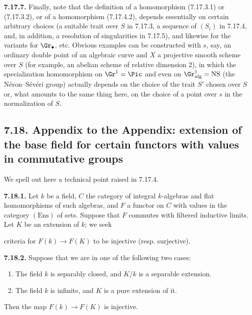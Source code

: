 \textbf{7.17.7.} Finally, note that the definition of a homomorphism (7.17.3.1) or (7.17.3.2), or of a homomorphism (7.17.4.2), depends essentially on certain arbitrary choices (a suitable trait over \(S\) in 7.17.3, a sequence of \((S_i)\) in 7.17.4, and, in addition, a resolution of singularities in 7.17.5), and likewise for the variants for \(\Gr_\bullet\), etc. Obvious examples can be constructed with \(s\), say, an ordinary double point of an algebraic curve and \(X\) a projective smooth scheme over \(S\) (for example, an abelian scheme of relative dimension 2), in which the specialization homomorphism on \(\Gr^1=\Pic\) and even on \(\Gr^1_{\mathrm{alg}}=\mathrm{NS}\) (the Néron--Sévéri group) actually depends on the choice of the trait \(S'\) chosen over \(S\) or, what amounts to the same thing here, on the choice of a point over \(s\) in the normalization of \(S\).

\subsection*{7.18. Appendix to the Appendix: extension of the base field for certain functors with values in commutative groups}
We spell out here a technical point raised in 7.17.4.

\textbf{7.18.1.} Let \(k\) be a field, \(C\) the category of integral \(k\)-algebras and flat homomorphisms of such algebras, and \(F\) a functor on \(C\) with values in the category \((\mathrm{Ens})\) of sets. Suppose that \(F\) commutes with filtered inductive limits. Let \(K\) be an extension of \(k\); we seek

%
criteria for \(F(k)\longrightarrow F(K)\) to be injective (resp. surjective).

\textbf{7.18.2.} Suppose that we are in one of the following two cases:
\begin{enumerate}[label=\alph*)]
\item The field \(k\) is separably closed, and \(K/k\) is a separable extension.
\item The field \(k\) is infinite, and \(K\) is a pure extension of it.
\end{enumerate}
Then the map \(F(k)\to F(K)\) is injective.

